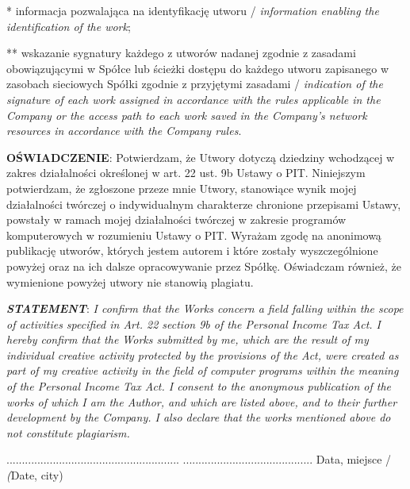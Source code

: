 \documentclass[10pt]{report}
\begin{document}
\begin{ThreePartTable}
		\begin{tablenotes}
			\item[*] informacja pozwalająca na identyfikację utworu / \textit{information enabling the identification of the work};
			\item[**] wskazanie sygnatury każdego z utworów nadanej zgodnie z zasadami obowiązującymi w Spółce lub ścieżki dostępu do każdego utworu zapisanego w zasobach sieciowych Spółki zgodnie z przyjętymi zasadami / \textit{indication of the signature of each work assigned in accordance with the rules applicable in the Company or the access path to each work saved in the Company's network resources in accordance with the Company rules}.
		\end{tablenotes}
	\end{ThreePartTable}
	
	\vspace{1 \baselineskip}
	
	{\textbf{OŚWIADCZENIE}:} {\normalsize Potwierdzam, że Utwory dotyczą dziedziny wchodzącej w zakres działalności określonej w art. 22 ust. 9b Ustawy o PIT. Niniejszym potwierdzam, że zgłoszone przeze mnie Utwory, stanowiące wynik mojej działalności twórczej o indywidualnym charakterze chronione przepisami Ustawy, powstały w ramach mojej działalności twórczej w zakresie programów komputerowych w rozumieniu Ustawy o PIT. Wyrażam zgodę na anonimową publikację utworów, których jestem autorem i które zostały wyszczególnione powyżej oraz na ich dalsze opracowywanie przez Spółkę. Oświadczam również, że wymienione powyżej utwory nie stanowią plagiatu.}\newline

	{\textit{\textbf{STATEMENT}}:} {\small \textit{I confirm that the Works concern a field falling within the scope of activities specified in Art. 22 section 9b of the Personal Income Tax Act. I hereby confirm that the Works submitted by me, which are the result of my individual creative activity protected by the provisions of the Act, were created as part of my creative activity in the field of computer programs within the meaning of the Personal Income Tax Act. I consent to the anonymous publication of the works of which I am the Author, and which are listed above, and to their further development by the Company. I also declare that the works mentioned above do not constitute plagiarism.}}\newline

	\vspace*{\fill}
	\noindent ........................................................ \hfill ..........................................\newline
	 \hfill {\small Data, miejsce / \textit(Date, city)}
\end{document}
